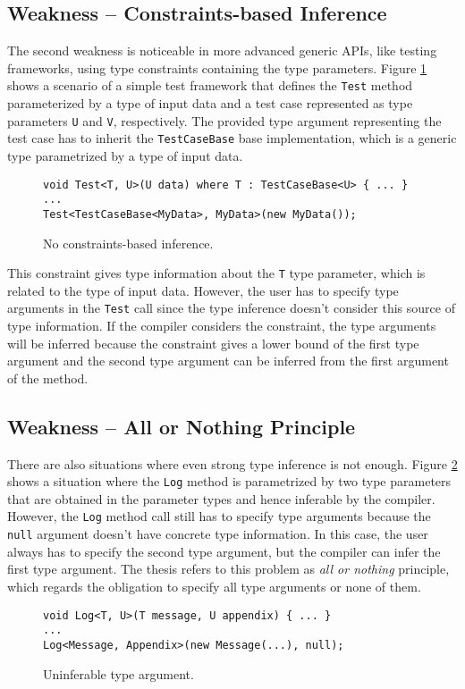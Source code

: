 \subsection{Weakness -- Constraints-based Inference}

The second weakness is noticeable in more advanced generic APIs, like testing frameworks, using type constraints containing the type parameters. 
Figure \ref{img28:usecase2} shows a scenario of a simple test framework that defines the \texttt{Test} method parameterized by a type of input data and a test case represented as type parameters \texttt{U} and \texttt{V}, respectively. 
The provided type argument representing the test case has to inherit the \texttt{TestCaseBase} base implementation, which is a generic type parametrized by a type of input data. 
\begin{figure}[h]
\begin{lstlisting}[style=csharp]
void Test<T, U>(U data) where T : TestCaseBase<U> { ... }
...
Test<TestCaseBase<MyData>, MyData>(new MyData());
\end{lstlisting}
\caption{No constraints-based inference.}
\label{img28:usecase2}
\end{figure}
This constraint gives type information about the \texttt{T} type parameter, which is related to the type of input data.
However, the user has to specify type arguments in the \texttt{Test} call since the type inference doesn’t consider this source of type information. 
If the compiler considers the constraint, the type arguments will be inferred because the constraint gives a lower bound of the first type argument and the second type argument can be inferred from the first argument of the method.

\subsection{Weakness -- All or Nothing Principle}

There are also situations where even strong type inference is not enough.
Figure \ref{img29:usecase3} shows a situation where the \texttt{Log} method is parametrized by two type parameters that are obtained in the parameter types and hence inferable by the compiler. 
However, the \texttt{Log} method call still has to specify type arguments because the \texttt{null} argument doesn’t have concrete type information. 
In this case, the user always has to specify the second type argument, but the compiler can infer the first type argument. 
The thesis refers to this problem as \textit{all or nothing} principle, which regards the obligation to specify all type arguments or none of them.
\begin{figure}[h]
\begin{lstlisting}[style=csharp]
void Log<T, U>(T message, U appendix) { ... }
...
Log<Message, Appendix>(new Message(...), null);
\end{lstlisting}
\caption{Uninferable type argument.}
\label{img29:usecase3}
\end{figure}

